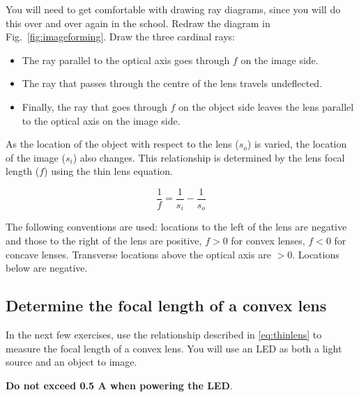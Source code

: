 \documentclass[a4paper]{report}
\newcommand{\nexercise}[0]{\arabic{exercises}\addtocounter{exercises}{1}}
\begin{document}
\begin{exercisebox}[frametitle={Exercise \nexercise: Ray tracing}]
You will need to get comfortable with drawing ray diagrams, since you will do this over and over again in the school.
Redraw the diagram in Fig.~\ref{fig:imageforming}.
Draw the three cardinal rays:
\begin{itemize}
\item The ray parallel to the optical axis goes through $f$ on the image side.
\item The ray that passes through the centre of the lens travels undeflected.
\item Finally, the ray that goes through $f$ on the object side leaves the lens parallel to the optical axis on the image side. 
\end{itemize}
\end{exercisebox}

As the location of the object with respect to the lens ($s_o$) is varied, the location of the image ($s_i$) also changes. This relationship is determined by the lens focal length ($f$) using the thin lens equation.

\begin{equation}
\frac{1}{f} = \frac{1}{s_i} - \frac{1}{s_o}
\label{eq:thinlens}
\end{equation}

The following conventions are used: locations to the left of the lens are negative and those to the right of the lens are positive, $f>0$ for convex lenses, $f<0$ for concave lenses.
Transverse locations above the optical axis are $>0$. Locations below are negative. 

\vspace{2.5em}



\clearpage




\subsection{Determine the focal length of a convex lens }
In the next few exercises, use the relationship described in \ref{eq:thinlens} to measure the focal length of a convex lens. You will use an LED as both a light source and an object to image. 
\vspace{1em}

\textbf{Do not exceed 0.5 A when powering the LED}.
\vspace{1em}

%
\end{document}
